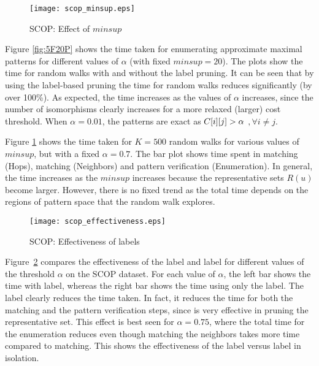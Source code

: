 \begin{figure}[!ht]
  \centerline{
    \texttt{[image: scop\_minsup.eps]}
	}
	\caption{SCOP: Effect of $minsup$}
    \label{fig:5F20P_ft}
\end{figure}


\smallskip{}
Figure \ref{fig:5F20P} shows the time taken for enumerating approximate
maximal patterns for different values of $\alpha$ (with fixed $minsup =
20$). The plots show the time for random walks with and without the
label pruning. It can be seen that by using the label-based pruning the
time for random walks reduces significantly (by over 100\%).  As
expected, the time increases as the values of $\alpha$ increases, since
the number of isomorphisms clearly increases for a more relaxed (larger)
cost threshold.  When $\alpha = 0.01$, the patterns are exact as
${C}[i][j] > \alpha$ $,\forall i \neq j$.

Figure \ref{fig:5F20P_ft} shows the time taken for $K=500$ random walks
for various values of $minsup$, but with a fixed $\alpha = 0.7$. The bar
plot shows time spent in \khop matching (Hops), \ncl matching
(Neighbors) and pattern verification (Enumeration). In general, the time
increases as the $minsup$ increases because the representative sets
$R(u)$ become larger. However, there is no fixed trend as the total time
depends on the regions of pattern space that the random walk explores.

\begin{figure}[!ht]
  \centerline{
    \texttt{[image: scop\_effectiveness.eps]}
	}
	\caption{SCOP: Effectiveness of labels}
    \label{fig:D5F20P_eff}
\end{figure}

Figure~\ref{fig:D5F20P_eff} compares the effectiveness of the \ncl
label and \khop label for different values of the
threshold $\alpha$ on the SCOP dataset.  For each value of $\alpha$, the
left bar shows the time with \ncl label, whereas the right bar
shows the time using only the \khop label.  The \ncl label clearly
reduces the time taken. In fact, it reduces the time for both the \khop
matching and the pattern verification steps, since \ncl is very
effective in pruning the representative set.  This effect is best seen
for $\alpha = 0.75$, where the total time for the enumeration reduces
even though matching the neighbors takes more time compared to \khop
matching.  This shows the effectiveness of the \ncl label versus
\khop label in isolation.

